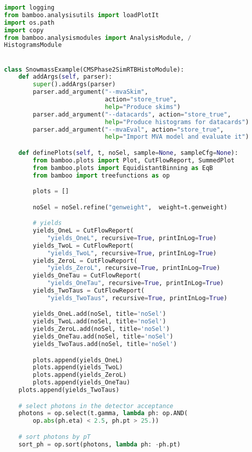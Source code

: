 \begin{lstlisting}[language=Python, caption=Python module of the analysis used in Bamboo framework, label={bamboocode}]
import logging
from bamboo.analysisutils import loadPlotIt
import os.path
import copy
from bamboo.analysismodules import AnalysisModule, /
HistogramsModule


class SnowmassExample(CMSPhase2SimRTBHistoModule):
    def addArgs(self, parser):
        super().addArgs(parser)
        parser.add_argument("--mvaSkim",
                            action="store_true",
                            help="Produce skims")
        parser.add_argument("--datacards", action="store_true",
                            help="Produce histograms for datacards")
        parser.add_argument("--mvaEval", action="store_true",
                            help="Import MVA model and evaluate it")

    def definePlots(self, t, noSel, sample=None, sampleCfg=None):
        from bamboo.plots import Plot, CutFlowReport, SummedPlot
        from bamboo.plots import EquidistantBinning as EqB
        from bamboo import treefunctions as op

        plots = []

        noSel = noSel.refine("genweight",  weight=t.genweight)

        # yields
        yields_OneL = CutFlowReport(
            "yields_OneL", recursive=True, printInLog=True)
        yields_TwoL = CutFlowReport(
            "yields_TwoL", recursive=True, printInLog=True)
        yields_ZeroL = CutFlowReport(
            "yields_ZeroL", recursive=True, printInLog=True)
        yields_OneTau = CutFlowReport(
            "yields_OneTau", recursive=True, printInLog=True)
        yields_TwoTaus = CutFlowReport(
            "yields_TwoTaus", recursive=True, printInLog=True)

        yields_OneL.add(noSel, title='noSel')
        yields_TwoL.add(noSel, title='noSel')
        yields_ZeroL.add(noSel, title='noSel')
        yields_OneTau.add(noSel, title='noSel')
        yields_TwoTaus.add(noSel, title='noSel')

        plots.append(yields_OneL)
        plots.append(yields_TwoL)
        plots.append(yields_ZeroL)
        plots.append(yields_OneTau)
    plots.append(yields_TwoTaus)

    # select photons in the detector acceptance
    photons = op.select(t.gamma, lambda ph: op.AND(
        op.abs(ph.eta) < 2.5, ph.pt > 25.))

    # sort photons by pT
    sort_ph = op.sort(photons, lambda ph: -ph.pt)


\end{lstlisting}
